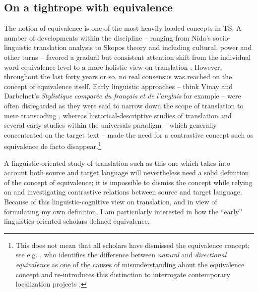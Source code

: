 \subsection{On a tightrope with equivalence}
\label{sec:2.2.4}  
The notion of equivalence is one of the most heavily loaded concepts in TS. A number of developments within the discipline – ranging from Nida’s socio-linguistic translation analysis \citep{nida_toward_1964,nida_theory_1969} to Skopos theory \citep{nord_translating_1997} and including cultural, power and other turns – favored a gradual but consistent attention shift from the individual word equivalence level to a more holistic view on translation \citep[10]{munday_issues_2009}. However, throughout the last forty years or so, no real consensus was reached on the concept of equivalence itself. Early linguistic approaches – think Vinay and Darbelnet’s \textit{Stylistique} \textit{comparée} \textit{du} \textit{français} \textit{et} \textit{de} \textit{l’anglais} \citep{vinay_stylistique_1958} for example – were often disregarded as they were said to narrow down the scope of translation to mere transcoding \citep[1]{vandeweghe_introduction:_2007}, whereas historical-descriptive studies of translation and several early studies within the universals paradigm – which generally concentrated on the target text – made the need for a contrastive concept such as equivalence de facto disappear.\footnote{This does not mean that all scholars have dismissed the equivalence concept; see e.g. \citet{pym_natural_2007}, who identifies the difference between \textit{natural} and \textit{directional equivalence} as one of the causes of misunderstanding about the equivalence concept and re-introduces this distinction to interrogate contemporary localization projects \citep[271]{pym_natural_2007}.}

A linguistic-oriented study of translation such as this one which takes into account both source and target language will nevertheless need a solid definition of the concept of equivalence; it is impossible to dismiss the concept while relying on and investigating contrastive relations between source and target language. Because of this linguistic-cognitive view on translation, and in view of formulating my own definition, I am particularly interested in how the ``early'' linguistics-oriented scholars defined equivalence.

